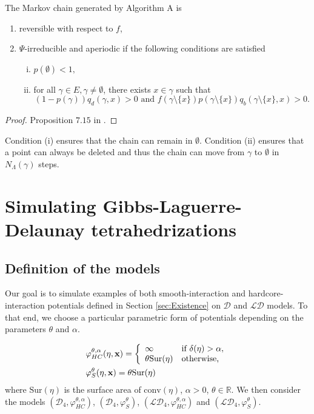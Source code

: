 \begin{proposition}\label{prop:algorithmconverges}
The Markov chain generated by Algorithm A is
\begin{enumerate}
\item reversible with respect to $f$,
\item $\Psi$-irreducible and aperiodic if the following conditions are satisfied
\begin{enumerate}[(i)]
	\item $p(\emptyset)<1,$
	\item for all $\gamma \in E, \gamma\neq \emptyset$, there exists $x \in \gamma$ such that
		\begin{equation}\label{eq:irreducibility}(1-p(\gamma))q_d(\gamma,x)>0 \text{ and } f(\gamma\setminus \{x\})p(\gamma \setminus \{x\}) q_b(\gamma\setminus \{x\},x)>0.\end{equation}
\end{enumerate}
\end{enumerate}
\end{proposition}
\begin{proof}
Proposition $7.15$ in \cite{MollerWaagepetersen2003}.
\end{proof}

Condition (i) ensures that the chain can remain in $\emptyset$. Condition (ii) ensures that a point can always be deleted and thus the chain can move from $\gamma$ to $\emptyset$ in $N_\Lambda(\gamma)$ steps.



\section{Simulating Gibbs-Laguerre-Delaunay tetrahedrizations} 
\subsection{Definition of the models}
Our goal is to simulate examples of both smooth-interaction and hardcore-interaction potentials defined in Section \ref{sec:Existence} on $\mathcal D$ and $\mathcal {LD}$ models. To that end, we choose a particular parametric form of potentials depending on the parameters $\theta$ and $\alpha$.

\begin{align}\label{modelHC}
&\varphi^{\theta,\alpha}_{HC}(\eta,{\mathbf{x}}) = 
\left\{
    \begin{array}{ll}
        \infty & \mbox{if } \delta(\eta)> \alpha, \\
        \theta \mathrm{Sur}(\eta) & \mbox{otherwise, }
    \end{array}
\right. \\
&\varphi^{\theta}_{S}(\eta,{\mathbf{x}}) =  \theta \mathrm{Sur}(\eta) 
\end{align}
where $\mathrm{Sur}(\eta)$ is the surface area of $\mathrm{conv}(\eta)$, $\alpha>0$, $\theta \in \mathbb R$. We then consider the models $(\mathcal D_4,\varphi^{\theta,\alpha}_{HC})$, $(\mathcal D_4,\varphi^{\theta}_{S})$, $(\mathcal {LD}_4,\varphi^{\theta,\alpha}_{HC})$ and $(\mathcal {LD}_4,\varphi^{\theta}_{S})$.



